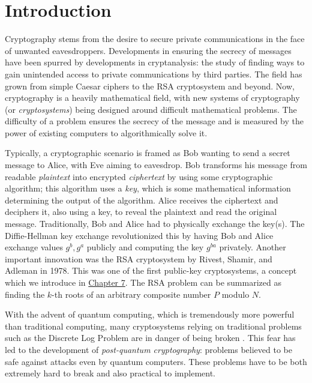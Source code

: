 \documentclass[a4paper,12pt]{article}
\begin{document}
\section{Introduction}

Cryptography stems from the desire to secure private communications in the face of unwanted eavesdroppers. Developments in ensuring the secrecy of messages have been spurred by developments in cryptanalysis: the study of finding ways to gain unintended access to private communications by third parties. The field has grown from simple Caesar ciphers to the RSA cryptosystem and beyond. Now, cryptography is a heavily mathematical field, with new systems of cryptography (or \textit{cryptosystems}) being designed around difficult mathematical problems. The difficulty of a problem ensures the secrecy of the message and is measured by the power of existing computers to algorithmically solve it.

Typically, a cryptographic scenario is framed as Bob wanting to send a secret message to Alice, with Eve aiming to eavesdrop. Bob transforms his message from readable \textit{plaintext} into encrypted \textit{ciphertext} by using some cryptographic algorithm; this algorithm uses a \textit{key}, which is some mathematical information determining the output of the algorithm. Alice receives the ciphertext and deciphers it, also using a key, to reveal the plaintext and read the original message. Traditionally, Bob and Alice had to physically exchange the key(s). The Diffie-Hellman key exchange revolutionized this by having Bob and Alice exchange values $g^b, g^a$ publicly and computing the key $g^{ba}$ privately. Another important innovation was the RSA cryptosystem by Rivest, Shamir, and Adleman in 1978. This was one of the first public-key cryptosystems, a concept which we introduce in \hyperref[Knapsack]{Chapter 7}. The RSA problem can be summarized as finding the $k$-th roots of an arbitrary composite number $P$ modulo $N$.  

With the advent of quantum computing, which is tremendously more powerful than traditional computing, many cryptosystems relying on traditional problems such as the Discrete Log Problem are in danger of being broken \cite{Mavroeidis}. This fear has led to the development of \textit{post-quantum cryptography}: problems believed to be safe against attacks even by quantum computers. These problems have to be both extremely hard to break and also practical to implement. 
\end{document}
